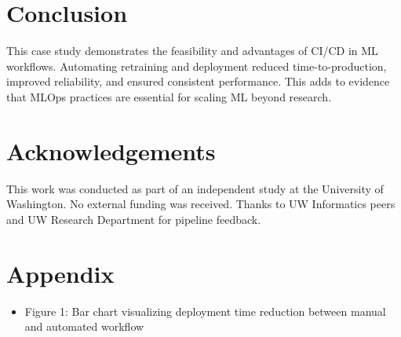 \documentclass[11pt]{article}
\begin{document}
\section{Conclusion} \label{sec:conclusion}
This case study demonstrates the feasibility and advantages of CI/CD in ML workflows. Automating retraining and deployment reduced time-to-production, improved reliability, and ensured consistent performance. This adds to evidence that MLOps practices are essential for scaling ML beyond research.

\section*{Acknowledgements}
This work was conducted as part of an independent study at the University of Washington. No external funding was received. Thanks to UW Informatics peers and UW Research Department for pipeline feedback.




\section*{Appendix}
\begin{itemize}
    \item Figure 1: Bar chart visualizing deployment time reduction between manual and automated workflow
\end{itemize}
\end{document}
